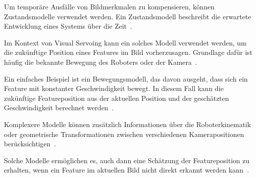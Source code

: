 Um temporäre Ausfälle von Bildmerkmalen zu kompensieren, können Zustandsmodelle verwendet werden. Ein Zustandsmodell beschreibt die erwartete Entwicklung eines Systems über die Zeit~\cite{thrun2005probabilistic}.

Im Kontext von Visual Servoing kann ein solches Modell verwendet werden, um die zukünftige Position eines Features im Bild vorherzusagen. Grundlage dafür ist häufig die bekannte Bewegung des Roboters oder der Kamera~\cite{chaumette2006visual, chaumette2007visual2}.

Ein einfaches Beispiel ist ein Bewegungsmodell, das davon ausgeht, dass sich ein Feature mit konstanter Geschwindigkeit bewegt. In diesem Fall kann die zukünftige Featureposition aus der aktuellen Position und der geschätzten Geschwindigkeit berechnet werden~\cite{welch1995kalman}.

Komplexere Modelle können zusätzlich Informationen über die Roboterkinematik oder geometrische Transformationen zwischen verschiedenen Kamerapositionen berücksichtigen~\cite{corke2017robotics}.

Solche Modelle ermöglichen es, auch dann eine Schätzung der Featureposition zu erhalten, wenn ein Feature im aktuellen Bild nicht direkt erkannt werden kann~\cite{thrun2005probabilistic}.

